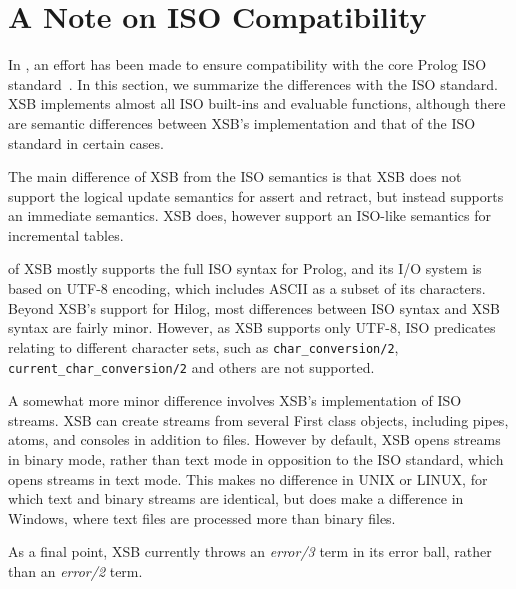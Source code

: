 \section{A Note on ISO Compatibility} \label{sec:iso}

In \version, an effort has been made to ensure compatibility with the
core Prolog ISO standard~\cite{ISO-Prolog}.  In this section, we
summarize the differences with the ISO standard.  XSB implements
almost all ISO built-ins and evaluable functions, although there are
semantic differences between XSB's implementation and that of the ISO
standard in certain cases.

The main difference of XSB from the ISO semantics is that XSB does not
support the logical update semantics for assert and retract, but
instead supports an immediate semantics.  XSB does, however support an
ISO-like semantics for incremental tables.


\version{} of XSB mostly supports the full ISO syntax for Prolog, and
its I/O system is based on UTF-8 encoding, which includes ASCII as a
subset of its characters.  Beyond XSB's support for Hilog, most
differences between ISO syntax and XSB syntax are fairly minor.
However, as XSB supports only UTF-8, ISO predicates relating to
different character sets, such as {\tt char\_conversion/2}, {\tt
  current\_char\_conversion/2} and others are not supported.

A somewhat more minor difference involves XSB's implementation of ISO
streams.  XSB can create streams from several First class objects,
including pipes, atoms, and consoles in addition to files.  However by
default, XSB opens streams in binary mode, rather than text mode in
opposition to the ISO standard, which opens streams in text mode.
This makes no difference in UNIX or LINUX, for which text and binary
streams are identical, but does make a difference in Windows, where
text files are processed more than binary files.

As a final point, XSB currently throws an {\em error/3} term in its
error ball, rather than an {\em error/2} term. 


